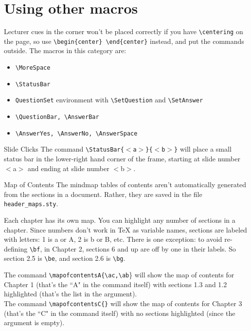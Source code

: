 \documentclass[10pt]{beamer}
\begin{document}
\section{Using other macros}
\frame{\tableofcontents[currentsection]}
\begin{frame}[t,fragile]
Lecturer cues in the corner won't be placed correctly if you have \verb|\centering| on the page, so use \verb|\begin{center} \end{center}| instead, and put the commands outside.
\vfill
The macros in this category are:
\begin{itemize}
\item \verb|\MoreSpace|
\item \verb|\StatusBar|
\item \texttt{QuestionSet} environment with \verb|\SetQuestion| and \verb|\SetAnswer| 
\item \verb|\QuestionBar, \AnswerBar|
\item \verb|\AnswerYes, \AnswerNo, \AnswerSpace|
\end{itemize}
\end{frame}
\begin{frame}[t]{Slide Clicks}
The command \texttt{\textbackslash StatusBar\{$<$a$>$\}\{$<$b$>$\}} will place a small status bar in the lower-right hand corner of the frame, starting at slide number $<$a$>$ and ending at slide number $<$b$>$.\vfill
{}
\end{frame}

\begin{frame}[t]{Map of Contents}
The mindmap tables of contents aren't automatically generated from the sections in a document. Rather, they are saved in the file \texttt{header\_maps.sty}.\vfill

Each chapter has its own map. You can highlight any number of sections in a chapter. Since numbers don't work in TeX as variable names, sections are labeled with letters: 1 is a or A, 2 is b or B, etc. There is one exception: to avoid re-defining \texttt{\textbackslash bf}, in Chapter 2, sections 6 and up are off by one in their labels. So section 2.5 is \texttt{\textbackslash be}, and section 2.6 is \texttt{\textbackslash bg}.
\vfill

The command \texttt{\textbackslash mapofcontentsA\{\textbackslash ac,\textbackslash ab}\} will show the map of contents for Chapter 1 (that's the ``A" in the command itself) with sections 1.3 and 1.2 highlighted (that's the list in the argument). \\

The command \texttt{\textbackslash mapofcontentsC\{\}} will show the map of contents for Chapter 3 (that's the ``C" in the command itself) with no sections highlighted (since the argument is empty).\\

\end{frame}
\end{document}

